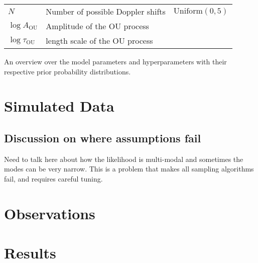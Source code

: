 \documentclass[12pt]{emulateapj}
\begin{document}
\begin{table*}[hbtp]
\begin{threeparttable}
\begin{tabularx}{\textwidth}{p{4.0cm}p{7.0cm}X}
$N$ & Number of possible Doppler shifts & $\mathrm{Uniform}(0,5)$  \\
$\log{A_{\mathrm{OU}}}$ & Amplitude of the OU process & \\
$\log{\tau_{\mathrm{OU}}}$ & length scale of the OU process & \\
\bottomrule
\end{tabularx}
   \begin{tablenotes}
      \item{An overview over the model parameters and hyperparameters with their respective prior probability distributions.}
\end{tablenotes}
\end{threeparttable}
\label{tab:priortable}
\end{table*}



\section{Simulated Data}

\subsection{Discussion on where assumptions fail}

Need to talk here about how the likelihood is multi-modal and sometimes the modes can be very narrow. 
This is a problem that makes all sampling algorithms fail, and requires careful tuning.


\section{Observations}

\section{Results}
\end{document}
